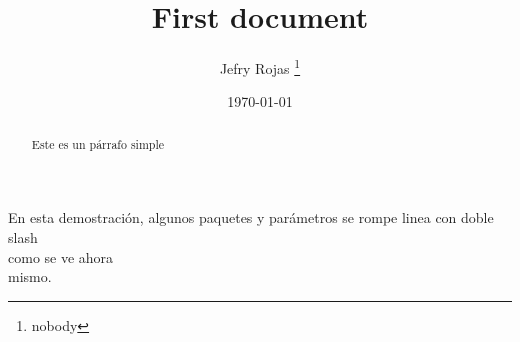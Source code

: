 \documentclass[12pt, a4paper]{article}
\title{First document}
\author{Jefry Rojas \thanks{nobody}}
\date{\today}
\begin{document}
\begin{titlepage}
\maketitle
\end{titlepage}

\begin{abstract}
Este es un párrafo simple 
\end{abstract}

En esta demostración, algunos paquetes y parámetros se rompe linea con doble slash \\ como se ve ahora \\ mismo.
\end{document}
